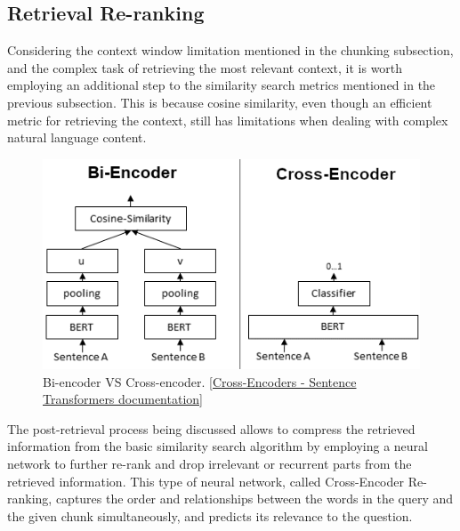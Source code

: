 \subsection{Retrieval Re-ranking}
Considering the context window limitation mentioned in the chunking subsection, and the complex task of retrieving the most relevant context, it is worth employing an additional step to the similarity search metrics mentioned in the previous subsection. This is because cosine similarity, even though an efficient metric for retrieving the context, still has limitations when dealing with complex natural language content.
\begin{figure}[H]
    \centering
    \includegraphics[width=.8\linewidth]{./figures/Bi_vs_Cross-Encoder.png}
    \caption{Bi-encoder VS Cross-encoder. \href{https://www.sbert.net/examples/applications/cross-encoder/README.html}{[Cross-Encoders - Sentence Transformers documentation]}}
\end{figure}
The post-retrieval process being discussed allows to compress the retrieved information from the basic similarity search algorithm by employing a neural network to further re-rank and drop irrelevant or recurrent parts from the retrieved information. This type of neural network, called Cross-Encoder Re-ranking, captures the order and relationships between the words in the query and the given chunk simultaneously, and predicts its relevance to the question.
